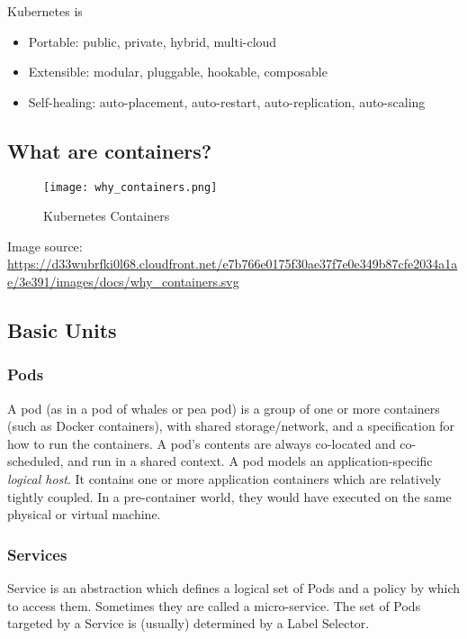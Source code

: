 Kubernetes is

\begin{itemize}

\item
  Portable: public, private, hybrid, multi-cloud
\item
  Extensible: modular, pluggable, hookable, composable
\item
  Self-healing: auto-placement, auto-restart, auto-replication,
  auto-scaling
\end{itemize}

\subsection{What are containers?}\label{what-are-containers}

\begin{figure}[htbp]
\centering
\texttt{[image: why\_containers.png]}
\caption{Kubernetes Containers}
\end{figure}

Image source:
\url{https://d33wubrfki0l68.cloudfront.net/e7b766e0175f30ae37f7e0e349b87cfe2034a1ae/3e391/images/docs/why_containers.svg}

\subsection{Basic Units}\label{basic-units}

\subsubsection{Pods}\label{pods}

A pod (as in a pod of whales or pea pod) is a group of one or more
containers (such as Docker containers), with shared storage/network, and
a specification for how to run the containers. A pod's contents are
always co-located and co-scheduled, and run in a shared context. A pod
models an application-specific \textit{logical host}. It contains one or
more application containers which are relatively tightly coupled. In
a pre-container world, they would have executed on the same physical or
virtual machine.

\subsubsection{Services}\label{services}

Service is an abstraction which defines a logical set of Pods and a
policy by which to access them. Sometimes they are called a
micro-service. The set of Pods targeted by a Service is (usually)
determined by a Label Selector.

